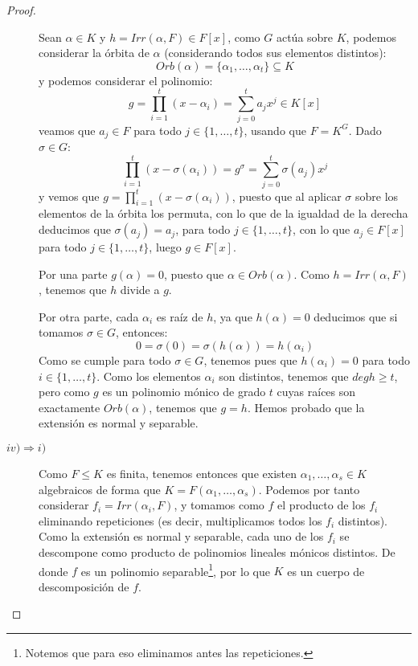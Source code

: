 \begin{teo}
\begin{proof}
\begin{description}
                Sean $\alpha\in K$ y $h = Irr(\alpha,F)\in F[x]$, como $G$ actúa sobre $K$, podemos considerar la órbita de $\alpha$ (considerando todos sus elementos distintos):
                \begin{equation*}
                    Orb(\alpha) = \{\alpha_1, \ldots, \alpha_t\} \subseteq K
                \end{equation*}
                y podemos considerar el polinomio:
                \begin{equation*}
                    g = \prod_{i=1}^{t}(x-\alpha_i) = \sum_{j=0}^{t} a_j x^j \in K[x]
                \end{equation*}
                veamos que $a_j \in F$ para todo $j\in \{1,\ldots,t\}$, usando que $F=K^G$. Dado $\sigma\in G$:
                \begin{equation*}
                    \prod_{i=1}^{t} (x-\sigma(\alpha_i)) = g^\sigma = \sum_{j=0}^{t} \sigma(a_j) x^j
                \end{equation*}
                y vemos que $g = \prod\limits_{i=1}^{t}(x-\sigma(\alpha_i))$, puesto que al aplicar $\sigma$ sobre los elementos de la órbita los permuta, con lo que de la igualdad de la derecha deducimos que $\sigma(a_j) = a_j$, para todo $j\in \{1,\ldots,t\}$, con lo que $a_j\in F[x]$ para todo $j \in \{1,\ldots,t\}$, luego $g\in F[x]$.

                Por una parte $g(\alpha) = 0$, puesto que $\alpha\in Orb(\alpha)$. Como $h=Irr(\alpha,F)$, tenemos que $h$ divide a $g$.

                Por otra parte, cada $\alpha_i$ es raíz de $h$, ya que $h(\alpha) = 0$ deducimos que si tomamos $\sigma\in G$, entonces:
                \begin{equation*}
                    0 = \sigma(0) = \sigma(h(\alpha)) = h(\alpha_i)
                \end{equation*}
                Como se cumple para todo $\sigma\in G$, tenemos pues que $h(\alpha_i) = 0$ para todo $i \in \{1,\ldots,t\}$. Como los elementos $\alpha_i$ son distintos, tenemos que $deg h \geq t$, pero como $g$ es un polinomio mónico de grado $t$ cuyas raíces son exactamente $Orb(\alpha)$, tenemos que $g=h$. Hemos probado que la extensión es normal y separable.
            \item [$iv)\Longrightarrow i)$] Como $F\leq K$ es finita, tenemos entonces que existen $\alpha_1, \ldots, \alpha_s\in K$ algebraicos de forma que $K = F(\alpha_1, \ldots, \alpha_s)$. Podemos por tanto considerar $f_i = Irr(\alpha_i, F)$, y tomamos como $f$ el producto de los $f_i$ eliminando repeticiones (es decir, multiplicamos todos los $f_i$ distintos). Como la extensión es normal y separable, cada uno de los $f_i$ se descompone como producto de polinomios lineales mónicos distintos. De donde $f$ es un polinomio separable\footnote{Notemos que para eso eliminamos antes las repeticiones.}, por lo que $K$ es un cuerpo de descomposición de $f$.
        \end{description}
    \end{proof}
\end{teo}

